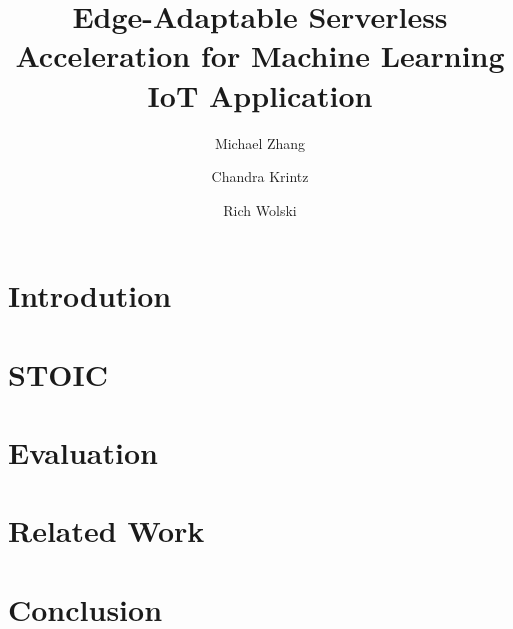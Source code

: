 \documentclass[10pt,sigplan, anonymous, authorversion]{acmart}
\begin{document}
\title{Edge-Adaptable Serverless Acceleration for Machine Learning IoT Application}
\author{Michael Zhang}
\author{Chandra Krintz}
\author{Rich Wolski}





\begin{abstract}
\label{sec:abstract}

\end{abstract}

\maketitle



\section{Introdution}
\label{sec:intro}


\section{STOIC}
\label{sec:stoic}


\section{Evaluation}
\label{sec:results}


\section{Related Work}
\label{sec:related}



\section{Conclusion}
\label{sec:conc}





% 


\end{document}
